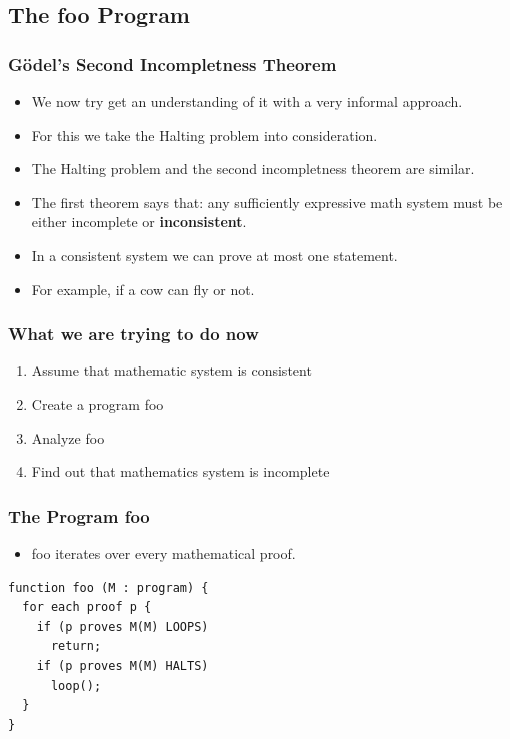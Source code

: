 \documentclass[aspectratio=169]{beamer}
\begin{document}
\subsection{The foo Program}
\begin{frame}
	\frametitle{Gödel's Second Incompletness Theorem}
	\begin{itemize}
		\item We now try get an understanding of it with a very informal approach.
		\item For this we take the Halting problem into consideration.
		\item The Halting problem and the second incompletness theorem are similar.
		\item The first theorem says that: any sufficiently expressive math system must be either incomplete or \textbf{inconsistent}.
		\item In a consistent system we can prove at most one statement. 
		\item [] For example, if a cow can fly or not.
	\end{itemize}
\end{frame}

\begin{frame}
	\frametitle{What we are trying to do now}
	\begin{enumerate}
		\item Assume that mathematic system is consistent
		\item Create a program foo
		\item Analyze foo
		\item Find out that mathematics system is incomplete
	\end{enumerate}
\end{frame}

\begin{frame}[fragile]
	\frametitle{The Program foo}
	\begin{itemize}
		\item foo iterates over every mathematical proof.
	\end{itemize}
	\begin{center}
	  \begin{lstlisting}[frame=single]
function foo (M : program) {
  for each proof p {
    if (p proves M(M) LOOPS) 
      return;
    if (p proves M(M) HALTS)
      loop();
  }
}
   \end{lstlisting}
   	\end{center}
\end{frame}
\end{document}
